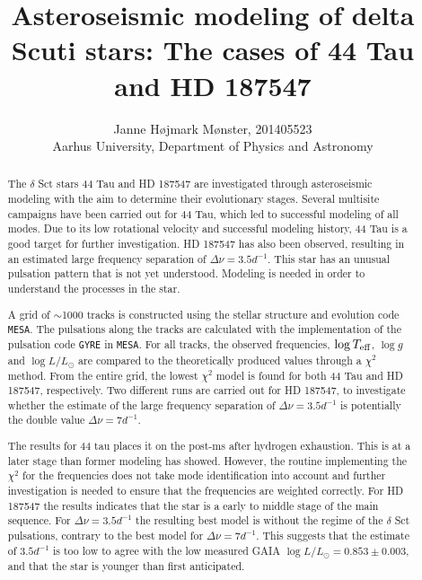\documentclass[a4paper,twoside,11pt]{memoir}
\title{Asteroseismic modeling of delta Scuti stars: The cases of 44 Tau and HD 187547}
\author{Janne Højmark Mønster, 201405523\\ Aarhus University, Department of Physics and Astronomy}
\newcommand{\chis}{\ensuremath{\chi^2}\xspace}
\newcommand{\teff}{\ensuremath{\log  T_{\textup{eff}}}\xspace}
\newcommand{\lum}{\ensuremath{\log L / L_{\odot}}\xspace}
\newcommand{\logg}{\ensuremath{\log g}\xspace}
\begin{document}
\maketitle
\thispagestyle{empty}
\vspace{0.5cm}

\begin{figure}[htbp]
	\centering
\end{figure}
\newpage

\begin{abstract}
	
	The $\delta$ Sct stars 44 Tau and HD 187547 are investigated through asteroseismic modeling with the aim to determine their evolutionary stages. Several multisite campaigns have been carried out for 44 Tau, which led to successful modeling of all modes. Due to its low rotational velocity and successful modeling history, 44 Tau is a good target for further investigation. HD 187547 has also been observed, resulting in an estimated large frequency separation of $\Delta\nu = 3.5d^{-1}$. This star has an unusual pulsation pattern  that is not yet understood. Modeling is needed in order to understand the processes in the star. 
	
	A grid of  $\sim$1000 tracks is constructed using the stellar structure and evolution code \texttt{MESA}. The pulsations along the tracks are calculated with the implementation of the pulsation code \texttt{GYRE} in \texttt{MESA}. For all tracks, the observed frequencies, \teff, \logg and \lum are compared to the theoretically produced values through a \chis method. From the entire grid, the lowest \chis model is found for both 44 Tau and HD 187547, respectively. Two different runs are carried out for HD 187547, to investigate whether the estimate of the large frequency separation of $\Delta\nu = 3.5d^{-1}$ is potentially the double value $\Delta\nu=7d^{-1}$. 
	
	The results for 44 tau places it on the post-ms after hydrogen exhaustion. This is at a later stage than former modeling has showed. However, the routine implementing the \chis for the frequencies does not take mode identification into account and further investigation is needed to ensure that the frequencies are weighted correctly. For HD 187547 the results indicates that the star is a early to middle stage of the main sequence.  For $\Delta\nu = 3.5 d^{-1}$ the resulting best model is without the regime of the $\delta$ Sct pulsations, contrary to the best model for $\Delta\nu = 7d^{-1}$. This suggests that the estimate of $3.5 d^{-1}$ is too low to agree with the low measured GAIA \lum$=0.853\pm0.003$, and that the star is younger than first anticipated.  
	

\end{abstract}
\newpage
\end{document}
